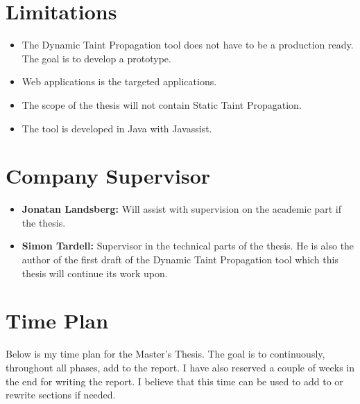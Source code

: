 \documentclass{../kththesis}
\begin{document}
	
	\section{Limitations}
	\begin{itemize}  
		\item The Dynamic Taint Propagation tool does not have to be a production ready. The goal is to develop a prototype.
		\item Web applications is the targeted applications.
		\item The scope of the thesis will not contain Static Taint Propagation.
		\item The tool is developed in Java with Javassist.
	\end{itemize}
	
	
	\section{Company Supervisor}
	\begin{itemize}
		\item \textbf{Jonatan Landsberg:} Will assist with supervision on the academic part if the thesis.
		\item \textbf{Simon Tardell:} Supervisor in the technical parts of the thesis. He is also the author of the first draft of the Dynamic Taint Propagation tool which this thesis will continue its work upon. 
	\end{itemize}
	
	
	\section{Time Plan}
	Below is my time plan for the Master’s Thesis. The goal is to continuously, throughout all phases, add to the report. I have also reserved a couple of weeks in the end for writing the report. I believe that this time can be used to add to or rewrite sections if needed. \\ \\
	
\end{document}
